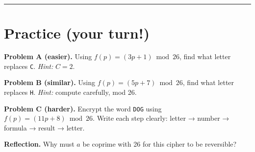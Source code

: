 \documentclass[12pt]{article}
\newcommand{\workbox}[1]{\fbox{\parbox{\dimexpr\textwidth-2\fboxsep-2\fboxrule\relax}{\vspace{#1}}}}
\begin{document}
\bigskip
\hrule
\vspace{0.5em}

\section*{Practice (your turn!)}

\textbf{Problem A (easier).} Using \(f(p)=(3p+1)\bmod26\), find what letter replaces \texttt{C}.  
\emph{Hint:} \(C=2\).
\workbox{2cm}

\textbf{Problem B (similar).} Using \(f(p)=(5p+7)\bmod26\), find what letter replaces \texttt{H}.  
\emph{Hint:} compute carefully, mod 26.
\workbox{2cm}

\textbf{Problem C (harder).} Encrypt the word \texttt{DOG} using \(f(p)=(11p+8)\bmod26\).  
Write each step clearly: letter → number → formula → result → letter.
\workbox{3cm}

\textbf{Reflection.} Why must \(a\) be coprime with 26 for this cipher to be reversible?
\workbox{2cm}
\end{document}
